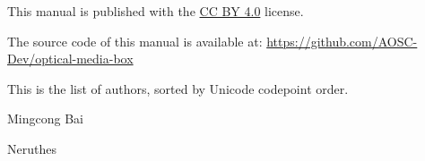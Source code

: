     This manual is published with the \underline{CC BY 4.0} license.

    The source code of this manual is available at:\newline
    \hspace{2em}\underline{\ttfamily\footnotesize{https://github.com/AOSC-Dev/optical-media-box}}

    \vspace{1ex}This is the list of authors, sorted by Unicode codepoint order.

    \begin{compactitem}
        \item Mingcong Bai
        \item Neruthes
    \end{compactitem}

    \pagestyle{empty}
    \cleardoublepage
